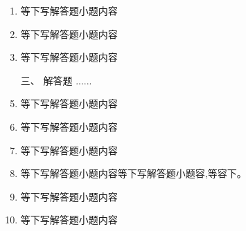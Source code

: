\documentclass[12pt,twocolumn,landscape,UTF8,twoside]{ctexart}
\begin{document}
\begin{spacing}{1.3}
\begin{enumerate} [1、]
		\item 等下写解答题小题内容 
		\item 等下写解答题小题内容 
		\item 等下写解答题小题内容  		
		\item[\heiti 三、] {\heiti 解答题  ......}
		\item 等下写解答题小题内容 \pd
		\item 等下写解答题小题内容 \pd
		\item 等下写解答题小题内容 \pd
		\item 等下写解答题小题内容等下写解答题小题容,等容下。 \pd
		\item 等下写解答题小题内容 \pd
		\item 等下写解答题小题内容 \pd
	\end{enumerate} 
	\end{spacing}
\end{document}
